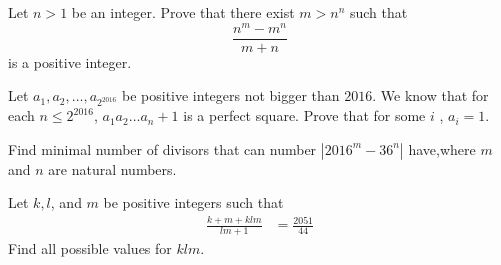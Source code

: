 \begin{problem}
	Let $n>1$ be an integer. Prove that there exist $m>n^n $ such that $$\frac {n^m-m^n}{m+n}$$ is a positive integer. %
\end{problem}

\begin{problem}
	Let $a_1, a_2, \dots, a_{2^{2016}}$ be positive integers not bigger than $2016$. We know that for each $n \leq 2^{2016}$, $a_1a_2 \dots a_{n} +1 $ is a perfect square. Prove that for some $i $ , $a_i=1$. %
\end{problem}

\begin{problem}
	Find minimal number of divisors that can number $|2016^m-36^n|$ have,where $m$ and $n$ are natural numbers. %
\end{problem}

%
%
%
%
%

\begin{problem}
	Let $k, l$, and $m$ be positive integers such that
	\begin{align*}
		\frac{k+m+klm}{lm+1} &= \frac{2051}{44}
	\end{align*}
	Find all possible values for $klm$.
\end{problem}

